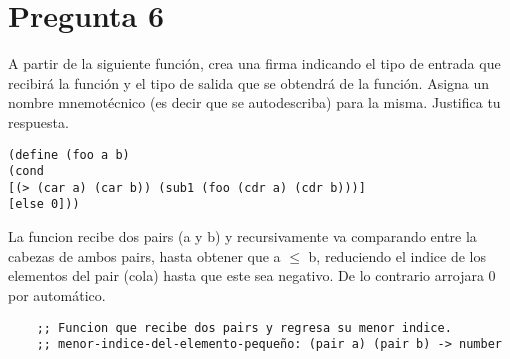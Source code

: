 \newpage
\section*{Pregunta 6}
\Large 
A partir de la siguiente función, crea una firma indicando el tipo de entrada que recibirá la función y el tipo de salida que se obtendrá de la función. Asigna un nombre mnemotécnico (es decir que se autodescriba) para la misma. Justifica tu respuesta.

\large
\begin{verbatim}
(define (foo a b)
(cond
[(> (car a) (car b)) (sub1 (foo (cdr a) (cdr b)))]
[else 0]))
\end{verbatim}
\large
La funcion recibe dos pairs (a y b) y recursivamente va comparando entre la cabezas de ambos pairs, hasta obtener que a $\leq$ b, reduciendo el indice de los elementos del pair (cola) hasta que este sea negativo. De lo contrario arrojara 0 por automático.

\large
\begin{verbatim}
	;; Funcion que recibe dos pairs y regresa su menor indice.  
	;; menor-indice-del-elemento-pequeño: (pair a) (pair b) -> number
\end{verbatim}